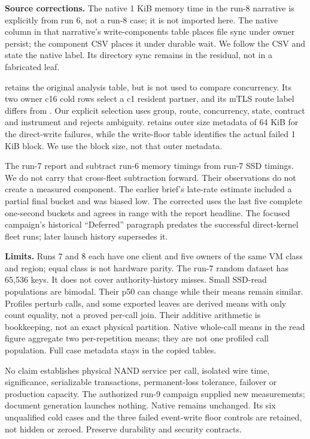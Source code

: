 \documentclass[10pt,a4paper]{article}
\begin{document}
\textbf{Source corrections.} The native 1 KiB memory time in the run-8 narrative is explicitly from run 6, not a run-8 case; it is not imported here. The native column in that narrative's write-components table places file sync under owner persist; the component CSV places it under durable wait. We follow the CSV and state the native label. Its directory sync remains in the residual, not in a fabricated leaf.

 retains the original analysis table, but is not used to compare concurrency. Its two owner c16 cold rows select a c1 resident partner, and its mTLS route label differs from . Our explicit selection uses group, route, concurrency, state, contract and instrument and rejects ambiguity.  retains outer size metadata of 64 KiB for the direct-write failures, while the write-floor table identifies the actual failed 1 KiB block. We use the block size, not that outer metadata.

The run-7 report and  subtract run-6 memory timings from run-7 SSD timings. We do not carry that cross-fleet subtraction forward. Their observations do not create a measured component. The earlier brief's late-rate estimate included a partial final bucket and was biased low. The corrected  uses the last five complete one-second buckets and agrees in range with the report headline. The focused campaign's historical ``Deferred'' paragraph predates the successful direct-kernel fleet runs; later launch history supersedes it.

\textbf{Limits.} Runs 7 and 8 each have one client and five owners of the same VM class and region; equal class is not hardware parity. The run-7 random dataset has 65,536 keys. It does not cover authority-history misses. Small SSD-read populations are bimodal. Their p50 can change while their means remain similar. Profiles perturb calls, and some exported leaves are derived means with only count equality, not a proved per-call join. Their additive arithmetic is bookkeeping, not an exact physical partition. Native whole-call means in the read figure aggregate two per-repetition means; they are not one profiled call population. Full case metadata stays in the copied tables.

No claim establishes physical NAND service per call, isolated wire time, significance, serializable transactions, permanent-loss tolerance, failover or production capacity. The authorized run-9 campaign supplied new measurements; document generation launches nothing. Native remains unchanged. Its six unqualified cold cases and the three failed event-write floor controls are retained, not hidden or zeroed. Preserve durability and security contracts.

\endgroup



\end{document}
